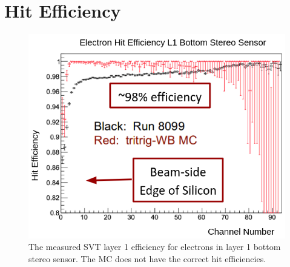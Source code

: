 
\clearpage

\section{Hit Efficiency}\label{sec:hiteff}

\begin{figure}[t]
    \centering
    \includegraphics[width=.85\textwidth]{figs/recon/hiteff.png}
    \caption{The measured SVT layer 1 efficiency for electrons in layer 1 bottom stereo sensor. The MC does not have the correct hit efficiencies. %
    }
    \label{fig:L1eff}
\end{figure}

